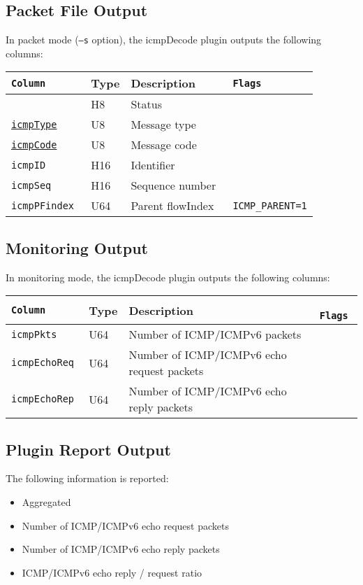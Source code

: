\documentclass[documentation]{subfiles}
\begin{document}
\subsection{Packet File Output}
In packet mode ({\tt --s} option), the icmpDecode plugin outputs the following columns:
\begin{longtable}{>{\tt}lll>{\tt\small}l}
    \toprule
    {\bf Column} & {\bf Type} & {\bf Description} & {\bf Flags}\\
    \midrule\endhead%
    \nameref{icmpStat}                  & H8  & Status           & \\
    \hyperref[icmpBFTypeCode]{icmpType} & U8  & Message type     & \\
    \hyperref[icmpBFTypeCode]{icmpCode} & U8  & Message code     & \\
    icmpID                              & H16 & Identifier       & \\
    icmpSeq                             & H16 & Sequence number  & \\
    icmpPFindex                         & U64 & Parent flowIndex & ICMP\_PARENT=1\\
    \bottomrule
\end{longtable}

\subsection{Monitoring Output}
In monitoring mode, the icmpDecode plugin outputs the following columns:
\begin{longtable}{>{\tt}lll>{\tt\small}l}
    \toprule
    {\bf Column} & {\bf Type} & {\bf Description} & {\bf Flags}\\
    \midrule\endhead%
    icmpPkts    & U64 & Number of ICMP/ICMPv6 packets              & \\
    icmpEchoReq & U64 & Number of ICMP/ICMPv6 echo request packets & \\
    icmpEchoRep & U64 & Number of ICMP/ICMPv6 echo reply packets   & \\
    \bottomrule
\end{longtable}

\subsection{Plugin Report Output}
The following information is reported:
\begin{itemize}
    \item Aggregated {\tt{}}
    \item Number of ICMP/ICMPv6 echo request packets
    \item Number of ICMP/ICMPv6 echo reply packets
    \item ICMP/ICMPv6 echo reply / request ratio
\end{itemize}
\end{document}
